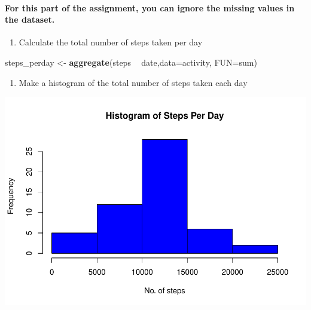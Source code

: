 \documentclass[]{article}
\newenvironment{Shaded}{\begin{snugshade}}{\end{snugshade}}
\newcommand{\KeywordTok}[1]{\textcolor[rgb]{0.13,0.29,0.53}{\textbf{#1}}}
\newcommand{\DataTypeTok}[1]{\textcolor[rgb]{0.13,0.29,0.53}{#1}}
\newcommand{\StringTok}[1]{\textcolor[rgb]{0.31,0.60,0.02}{#1}}
\newcommand{\OperatorTok}[1]{\textcolor[rgb]{0.81,0.36,0.00}{\textbf{#1}}}
\newcommand{\NormalTok}[1]{#1}
\providecommand{\tightlist}{%
  \setlength{\itemsep}{0pt}\setlength{\parskip}{0pt}}
\let\oldparagraph\paragraph
\renewcommand{\paragraph}[1]{\oldparagraph{#1}\mbox{}}
\begin{document}
\paragraph{For this part of the assignment, you can ignore the missing
values in the
dataset.}\label{for-this-part-of-the-assignment-you-can-ignore-the-missing-values-in-the-dataset.}

\begin{enumerate}
\def\labelenumi{\arabic{enumi}.}
\tightlist
\item
  Calculate the total number of steps taken per day
\end{enumerate}

\begin{Shaded}
\begin{Highlighting}[]
\NormalTok{steps_perday <-}\StringTok{ }\KeywordTok{aggregate}\NormalTok{(steps }\OperatorTok{~}\StringTok{ }\NormalTok{date,}\DataTypeTok{data=}\NormalTok{activity, }\DataTypeTok{FUN=}\NormalTok{sum)}
\end{Highlighting}
\end{Shaded}

\begin{enumerate}
\def\labelenumi{\arabic{enumi}.}
\setcounter{enumi}{1}
\tightlist
\item
  Make a histogram of the total number of steps taken each day
\end{enumerate}

\begin{Shaded}
\end{Shaded}

\includegraphics{PA1_template_files/figure-latex/unnamed-chunk-4-1.pdf}
\end{document}
